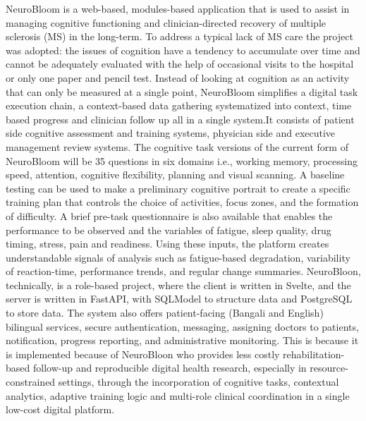 \documentclass[12pt,a4paper]{report}
\begin{document}
NeuroBloom is a web-based, modules-based application that is used to assist in managing cognitive functioning and clinician-directed recovery of multiple sclerosis (MS) in the long-term. To address a typical lack of MS care the project was adopted: the issues of cognition have a tendency to accumulate over time and cannot be adequately evaluated with the help of occasional visits to the hospital or only one paper and pencil test. Instead of looking at cognition as an activity that can only be measured at a single point, NeuroBloom simplifies a digital task execution chain, a context-based data gathering systematized into context, time based progress and clinician follow up all in a single system.It consists of patient side cognitive assessment and training systems, physician side and executive management review systems. The cognitive task versions of the current form of NeuroBloom will be 35 questions in six domains i.e., working memory, processing speed, attention, cognitive flexibility, planning and visual scanning. A baseline testing can be used to make a preliminary cognitive portrait to create a specific training plan that controls the choice of activities, focus zones, and the formation of difficulty. A brief pre-task questionnaire is also available that enables the performance to be observed and the variables of fatigue, sleep quality, drug timing, stress, pain and readiness. Using these inputs, the platform creates understandable signals of analysis such as fatigue-based degradation, variability of reaction-time, performance trends, and regular change summaries.
NeuroBloon, technically, is a role-based project, where the client is written in Svelte, and the server is written in FastAPI, with SQLModel to structure data and PostgreSQL to store data. The system also offers patient-facing (Bangali and English) bilingual services, secure authentication, messaging, assigning doctors to patients, notification, progress reporting, and administrative monitoring. This is because it is implemented because of NeuroBloon who provides less costly rehabilitation-based follow-up and reproducible digital health research, especially in resource-constrained settings, through the incorporation of cognitive tasks, contextual analytics, adaptive training logic and multi-role clinical coordination in a single low-cost digital platform.

\clearpage

\tableofcontents
\clearpage

\listoftables
{}
\clearpage
\end{document}
